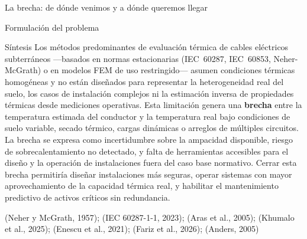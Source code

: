\documentclass[aspectratio=169]{beamer}
\newcommand{\refcite}[1]{{\footnotesize\color{gray!70!black} #1}}
\begin{document}
\begin{frame}{La brecha: de dónde venimos y a dónde queremos llegar}
\begin{center}
{%
}
\end{center}
\end{frame}

\begin{frame}{Formulación del problema}
\begin{exampleblock}{Síntesis}
\justifying\small
Los métodos predominantes de evaluación térmica de cables eléctricos
subterráneos ---basados en normas estacionarias (IEC~60287, IEC~60853,
Neher-McGrath) o en modelos FEM de uso restringido--- asumen condiciones
térmicas homogéneas y no están diseñados para representar la heterogeneidad
real del suelo, los casos de instalación complejos ni la estimación inversa
de propiedades térmicas desde mediciones operativas. Esta limitación genera
una \textbf{brecha} entre la temperatura estimada del conductor y la
temperatura real bajo condiciones de suelo variable, secado térmico, cargas
dinámicas o arreglos de múltiples circuitos. La brecha se expresa como
incertidumbre sobre la ampacidad disponible, riesgo de sobrecalentamiento
no detectado, y falta de herramientas accesibles para el diseño y la
operación de instalaciones fuera del caso base normativo. Cerrar esta brecha
permitiría diseñar instalaciones más seguras, operar sistemas con mayor
aprovechamiento de la capacidad térmica real, y habilitar el mantenimiento
predictivo de activos críticos sin redundancia.
\end{exampleblock}

\vspace{0.3em}
\refcite{(Neher y McGrath, 1957); (IEC 60287-1-1, 2023); (Aras et al., 2005);
(Khumalo et al., 2025); (Enescu et al., 2021); (Fariz et al., 2026);
(Anders, 2005)}
\end{frame}
\end{document}
